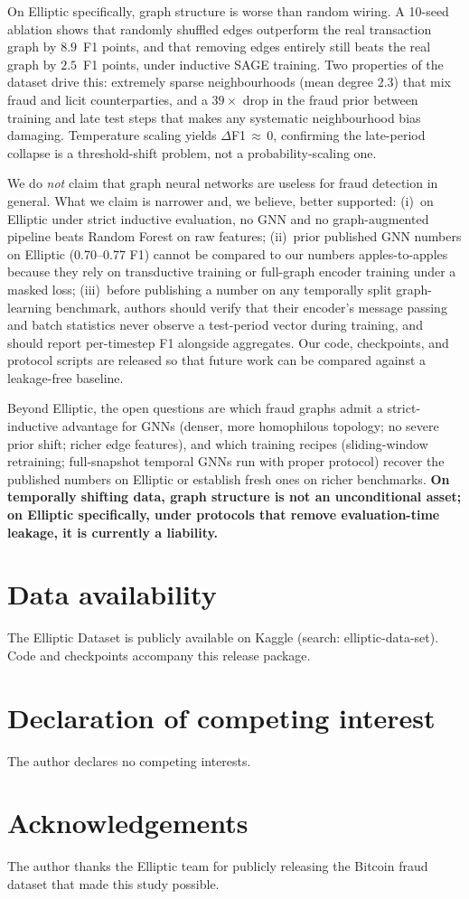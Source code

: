On Elliptic specifically, graph structure is worse than random
wiring.  A 10-seed ablation shows that randomly shuffled edges
outperform the real transaction graph by $8.9$~F1 points, and that
removing edges entirely still beats the real graph by $2.5$~F1
points, under inductive SAGE training.  Two properties of the dataset drive this:
extremely sparse neighbourhoods (mean degree 2.3) that mix fraud and
licit counterparties, and a $39\times$ drop in the fraud prior
between training and late test steps that makes any systematic
neighbourhood bias damaging.  Temperature scaling yields
$\Delta$F1\,$\approx$\,0, confirming the late-period collapse is a
threshold-shift problem, not a probability-scaling one.

We do \emph{not} claim that graph neural networks are useless for
fraud detection in general.  What we claim is narrower and, we
believe, better supported: (i)~on Elliptic under strict inductive
evaluation, no GNN and no graph-augmented pipeline beats Random
Forest on raw features; (ii)~prior published GNN numbers on Elliptic
(0.70--0.77 F1) cannot be compared to our numbers apples-to-apples
because they rely on transductive training or full-graph encoder
training under a masked loss; (iii)~before publishing a number on any
temporally split graph-learning benchmark, authors should verify
that their encoder's message passing and batch statistics never
observe a test-period vector during training, and should report
per-timestep F1 alongside aggregates.  Our code, checkpoints, and
protocol scripts are released so that future work can be compared
against a leakage-free baseline.

Beyond Elliptic, the open questions are which fraud graphs admit a
strict-inductive advantage for GNNs (denser, more homophilous
topology; no severe prior shift; richer edge features), and which
training recipes (sliding-window retraining; full-snapshot temporal
GNNs run with proper protocol) recover the published numbers on
Elliptic or establish fresh ones on richer benchmarks.  \textbf{On
temporally shifting data, graph structure is not an unconditional
asset; on Elliptic specifically, under protocols that remove
evaluation-time leakage, it is currently a liability.}

\section*{Data availability}
The Elliptic Dataset is publicly available on Kaggle
(search: elliptic-data-set).
Code and checkpoints accompany this release package.

\section*{Declaration of competing interest}
The author declares no competing interests.

\section*{Acknowledgements}
The author thanks the Elliptic team for publicly releasing the Bitcoin
fraud dataset that made this study possible.
